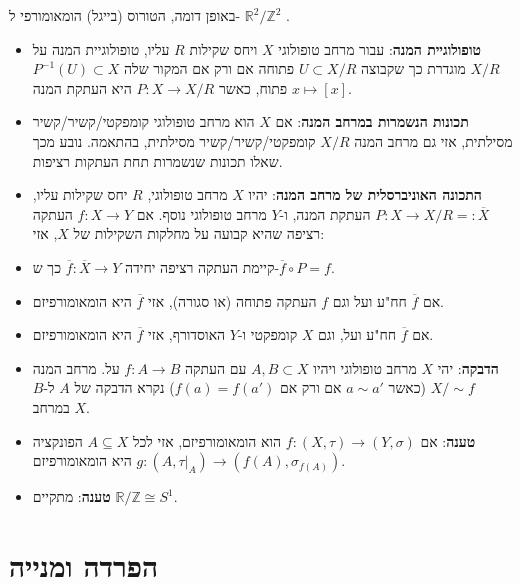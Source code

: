 \documentclass{tstextbook}
\begin{document}
\begin{remark}
באופן דומה, הטורוס (בייגל) הומאומורפי ל- \(\mathbb{R}^{2}/\mathbb{Z}^{2}\) .

\end{remark}
\begin{summary}
  \begin{itemize}
    \item \textbf{טופולוגיית המנה}: עבור מרחב טופולוגי \(X\) ויחס שקילות \(R\) עליו, טופולוגיית המנה על \(X/R\) מוגדרת כך שקבוצה \(U\subset X/R\) פתוחה אם ורק אם המקור שלה \(P^{-1}(U)\subset X\) פתוח, כאשר \(P:X\rightarrow X/R\) היא העתקת המנה \(x\mapsto[x]\).
    \item \textbf{תכונות הנשמרות במרחב המנה}: אם \(X\) הוא מרחב טופולוגי קומפקטי/קשיר/קשיר מסילתית, אזי גם מרחב המנה \(X/R\) קומפקטי/קשיר/קשיר מסילתית, בהתאמה. נובע מכך שאלו תכונות שנשמרות תחת העתקות רציפות.
    \item \textbf{התכונה האוניברסלית של מרחב המנה}: יהיו \(X\) מרחב טופולוגי, \(R\) יחס שקילות עליו, \(P:X\rightarrow X/R=:\overline{X}\) העתקת המנה, ו-\(Y\) מרחב טופולוגי נוסף. אם \(f:X\rightarrow Y\) העתקה רציפה שהיא קבועה על מחלקות השקילות של \(X\), אזי:


    \item קיימת העתקה רציפה יחידה \(\overline{f}:\overline{X}\rightarrow Y\) כך ש-\(\overline{f}\circ P=f\). 


    \item אם \(\overline{f}\) חח"ע ועל וגם \(f\) העתקה פתוחה (או סגורה), אזי \(\overline{f}\) היא הומאומורפיזם. 


    \item אם \(\overline{f}\) חח"ע ועל, וגם \(X\) קומפקטי ו-\(Y\) האוסדורף, אזי \(\overline{f}\) היא הומאומורפיזם. 


    \item \textbf{הדבקה}: יהי \(X\) מרחב טופולוגי ויהיו \(A,B\subset X\) עם העתקה \(f:A\rightarrow B\) על. מרחב המנה \(X/\sim f\) (כאשר \(a\sim a'\) אם ורק אם \(f(a)=f(a')\)) נקרא הדבקה של \(A\) ל-\(B\) במרחב \(X\).
    \item \textbf{טענה}: אם \(f:(X,\tau)\to (Y,\sigma)\) הוא הומאומורפיזם, אזי לכל \(A\subseteq X\) הפונקציה \(g:(A,\tau|_{A})\to(f(A),\sigma_{f(A)})\) היא הומאומורפיזם.
    \item \textbf{טענה}: מתקיים \(\mathbb{R}/\mathbb{Z}\cong S^{1}\).
  \end{itemize}
\end{summary}
\chapter{הפרדה ומנייה}
\end{document}
